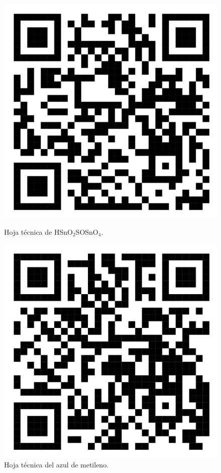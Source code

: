 \documentclass[12pt]{article}
\begin{document}
\begin{figure}[htbp]
  \begin{minipage}{0.4\textwidth}
    \centering
    \includegraphics[width=\linewidth]{Imagenes/H2SO4.png}
    \caption{Hoja técnica de H{SnO}$\displaystyle _{2}$SO{SnO}$\displaystyle _{4}$.}
    \label{fig:imagen5}
  \end{minipage}\hfill
  \begin{minipage}{0.4\textwidth}
    \centering
        \includegraphics[width=\linewidth]{Imagenes/AM_QR.png}
    \caption{Hoja técnica del azul de metileno.}
    \label{fig:AM_QR.png}
  \end{minipage}
\end{figure}
\end{document}
